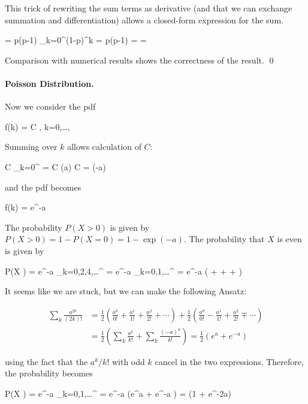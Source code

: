 This trick of rewriting the sum terms as derivative (and that we can exchange summation and differentiation) allows a closed-form expression for the sum. 

\bee
\mu = p(p-1)  \sum_{k=0}^\infty (1-p)^k = p(p-1)   =  = 
\eee

Comparison with numerical results shows the correctness of the result. \qed

\paragraph{Poisson Distribution.} Now we consider the pdf

\bee
f(k) = C , \quad k=0,\ldots,\infty
\eee

Summing over $k$ allows calculation of $C$:

\bee
C \sum_{k=0}^\infty {} = C \exp(a)  \rightarrow C = \exp(-a)
\eee

and the pdf becomes

\bee
f(k) = e^{-a} 
\eee

The probability $P(X > 0)$ is given by $P(X>0) = 1 - P(X=0) = 1-\exp(-a)$. The probability that $X$ is even is given by

\bee
P(X ) = e^{-a} \sum_{k=0,2,4,\ldots}^\infty {} = e^{-a} \sum_{k=0,1,\ldots}^\infty {} = e^{-a} \left(  +  +  + \cdots \right)
\eee

It seems like we are stuck, but we can make the following Ansatz:

\begin{align*}
\sum_k \frac{a^{2k}}{(2k)!} &= \frac{1}{2} \left(\frac{a^0}{0!} + \frac{a^1}{1!} + \frac{a^2}{2!} + \cdots \right) + \frac{1}{2} \left(\frac{a^0}{0!} - \frac{a^1}{1!} + \frac{a^2}{2!} \mp \cdots \right) \\ &= \frac{1}{2} \left( \sum_k \frac{a^k}{k!} + \sum_k \frac{(-a)^k}{k!} \right) = \frac{1}{2} \left(e^a + e^{-a} \right)
\end{align*}

using the fact that the $a^k/k!$ with odd $k$ cancel in the two expressions. Therefore, the probability becomes

\bee
P(X ) = e^{-a} \sum_{k=0,1,\ldots}^\infty {} =  e^{-a} \left(e^a + e^{-a} \right) =  (1 + e^{-2a})
\eee

